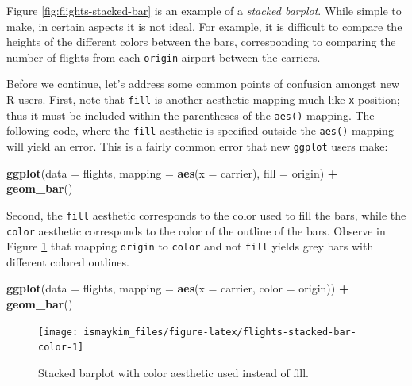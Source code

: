 \documentclass[12pt, krantz2,]{krantz}
\makeatletter
\newenvironment{Shaded}{\begin{snugshade}}{\end{snugshade}}
\newcommand{\DataTypeTok}[1]{\textcolor[rgb]{0.27,0.27,0.27}{#1}}
\newcommand{\KeywordTok}[1]{\textcolor[rgb]{0.27,0.27,0.27}{\textbf{#1}}}
\newcommand{\NormalTok}[1]{#1}
\newcommand{\OperatorTok}[1]{\textcolor[rgb]{0.43,0.43,0.43}{\textbf{#1}}}
\newcommand{\StringTok}[1]{\textcolor[rgb]{0.5,0.5,0.5}{#1}}
\newenvironment{kframe}{%
\medskip{}
\setlength{\fboxsep}{.8em}
 \def\at@end@of@kframe{}%
 \ifinner\ifhmode%
  \def\at@end@of@kframe{\end{minipage}}%
  \begin{minipage}{\columnwidth}%
 \fi\fi%
 \def\FrameCommand##1{\hskip\@totalleftmargin \hskip-\fboxsep
 \colorbox{shadecolor}{##1}\hskip-\fboxsep
     \hskip-\linewidth \hskip-\@totalleftmargin \hskip\columnwidth}%
 \MakeFramed {\advance\hsize-\width
   \@totalleftmargin\z@ \linewidth\hsize
   \@setminipage}}%
 {\par\unskip\endMakeFramed%
 \at@end@of@kframe}
\renewenvironment{Shaded}{\begin{kframe}}{\end{kframe}}
\makeatother
\begin{document}
Figure \ref{fig:flights-stacked-bar} is an example of a \emph{stacked barplot}. While simple to make, in certain aspects it is not ideal. For example, it is difficult to compare the heights of the different colors between the bars, corresponding to comparing the number of flights from each \texttt{origin} airport between the carriers.

Before we continue, let's address some common points of confusion amongst new R users. First, note that \texttt{fill} is another aesthetic mapping much like \texttt{x}-position; thus it must be included within the parentheses of the \texttt{aes()} mapping. The following code, where the \texttt{fill} aesthetic is specified outside the \texttt{aes()} mapping will yield an error. This is a fairly common error that new \texttt{ggplot} users make:

\begin{Shaded}
\begin{Highlighting}[]
\KeywordTok{ggplot}\NormalTok{(}\DataTypeTok{data =}\NormalTok{ flights, }\DataTypeTok{mapping =} \KeywordTok{aes}\NormalTok{(}\DataTypeTok{x =}\NormalTok{ carrier), }\DataTypeTok{fill =}\NormalTok{ origin) }\OperatorTok{+}
\StringTok{  }\KeywordTok{geom_bar}\NormalTok{()}
\end{Highlighting}
\end{Shaded}

Second, the \texttt{fill} aesthetic corresponds to the color used to fill the bars, while the \texttt{color} aesthetic corresponds to the color of the outline of the bars. Observe in Figure \ref{fig:flights-stacked-bar-color} that mapping \texttt{origin} to \texttt{color} and not \texttt{fill} yields grey bars with different colored outlines.

\begin{Shaded}
\begin{Highlighting}[]
\KeywordTok{ggplot}\NormalTok{(}\DataTypeTok{data =}\NormalTok{ flights, }\DataTypeTok{mapping =} \KeywordTok{aes}\NormalTok{(}\DataTypeTok{x =}\NormalTok{ carrier, }\DataTypeTok{color =}\NormalTok{ origin)) }\OperatorTok{+}
\StringTok{  }\KeywordTok{geom_bar}\NormalTok{()}
\end{Highlighting}
\end{Shaded}

\begin{figure}

{\centering \texttt{[image: ismaykim\_files/figure-latex/flights-stacked-bar-color-1]} 

}

\caption{Stacked barplot with color aesthetic used instead of fill.}\label{fig:flights-stacked-bar-color}
\end{figure}
\end{document}
